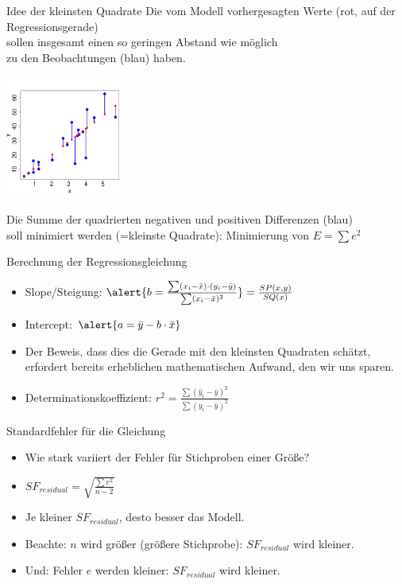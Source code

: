 \begin{frame}
  {Idee der kleinsten Quadrate}
  Die vom Modell vorhergesagten Werte (rot, auf der Regressionsgerade)\\
  sollen insgesamt einen so geringen Abstand wie möglich\\
  zu den Beobachtungen (blau) haben.
  \vspace{-0.5cm}
  \begin{center}
    \includegraphics[width=0.3\textwidth]{graphics/lmerrors}
  \end{center}
  \pause
  Die Summe der \alert{quadrierten} negativen und positiven Differenzen (blau)\\
  soll \alert{minimiert} werden (=kleinste Quadrate): Minimierung von \alert{$E=\sum e^2$}
\end{frame}

\begin{frame}
  {Berechnung der Regressionsgleichung}
  \begin{itemize}[<+->]
    \item Slope\slash Steigung: $\alert{b=\frac{\sum(x_i-\bar{x})\cdot(y_i-\bar{y})}{\sum(x_i-\bar{x})^2}}=\frac{SP(x,y)}{SQ(x)}$
      \vspace{0.5cm}
    \item Intercept: $\alert{a=\bar{y}-b\cdot\bar{x}}$
      \vspace{0.5cm}
    \item Der Beweis, dass dies die Gerade mit den kleinsten Quadraten schätzt,
      erfordert bereits erheblichen mathematischen Aufwand, den wir uns sparen.
      \vspace{0.5cm}
    \item Determinationskoeffizient: \alert{$r^2=\frac{\sum(\hat{y}_i-\bar{y})^2}{\sum(y_i-\bar{y})^2}$}
    \end{itemize}
\end{frame}

\begin{frame}
  {Standardfehler für die Gleichung}
  \begin{itemize}[<+->]
    \item Wie stark variiert der Fehler für Stichproben einer Größe?
      \vspace{0.5cm}
    \item \alert{$SF_{residual}=\sqrt{\frac{\sum e^2}{n-2}}$}
      \vspace{0.5cm}
    \item Je kleiner $SF_{residual}$, desto besser das Modell.
    \item Beachte: $n$ wird größer (größere Stichprobe): $SF_{residual}$ wird kleiner.
    \item Und: Fehler $e$ werden kleiner: $SF_{residual}$ wird kleiner.
  \end{itemize}
\end{frame}


